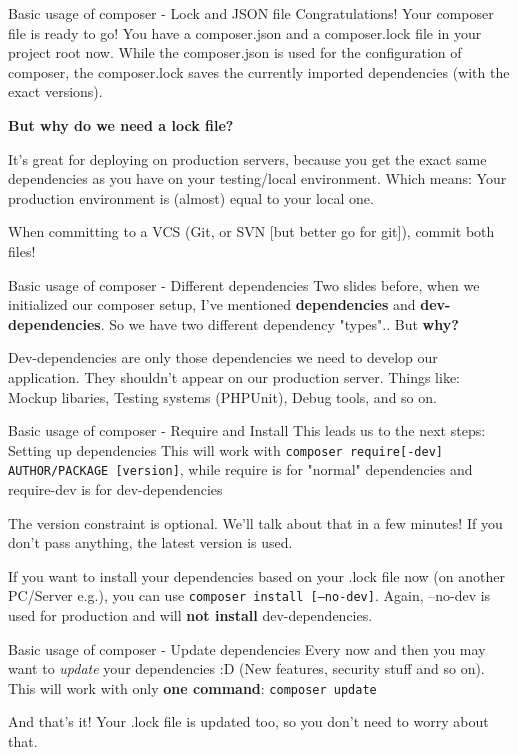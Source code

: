 \begin{frame}{Basic usage of composer - Lock and JSON file}
	Congratulations! Your composer file is ready to go! You have a composer.json and a composer.lock file in your project root now. While the composer.json is used for the configuration of composer, the composer.lock saves the currently imported dependencies (with the exact versions).\pause
	
	\textbf{But why do we need a lock file?}\pause
	
	It's great for deploying on production servers, because you get the exact same dependencies as you have on your testing/local environment. Which means: Your production environment is (almost) equal to your local one.
	
	When committing to a VCS \pause (Git, or SVN [but better go for git]), commit both files!
\end{frame}

\begin{frame}{Basic usage of composer - Different dependencies}
	Two slides before, when we initialized our composer setup, I've mentioned \textbf{dependencies} and \textbf{dev-dependencies}. So we have two different dependency "types".. But \textbf{why?} \pause
	
	Dev-dependencies are only those dependencies we need to develop our application. They shouldn't appear on our production server. Things like: Mockup libaries, Testing systems (PHPUnit), Debug tools, and so on. \pause
\end{frame}


\begin{frame}{Basic usage of composer - Require and Install}
	This leads us to the next steps: Setting up dependencies
	This will work with \texttt{composer require[-dev] AUTHOR/PACKAGE [version]}, while require is for "normal" dependencies and require-dev is for dev-dependencies \pause
	
	The version constraint is optional. We'll talk about that in a few minutes! If you don't pass anything, the latest version is used. \pause
	
	If you want to install your dependencies based on your .lock file now (on another PC/Server e.g.), you can use \texttt{composer install [--no-dev]}. Again, --no-dev is used for production and will \textbf{not install} dev-dependencies.
	
\end{frame}

\begin{frame}{Basic usage of composer - Update dependencies}
	Every now and then you may want to \emph{update} your dependencies :D (New features, security stuff and so on). This will work with only \textbf{one command}: \texttt{composer update}\pause
	
	And that's it! Your .lock file is updated too, so you don't need to worry about that.
\end{frame}

